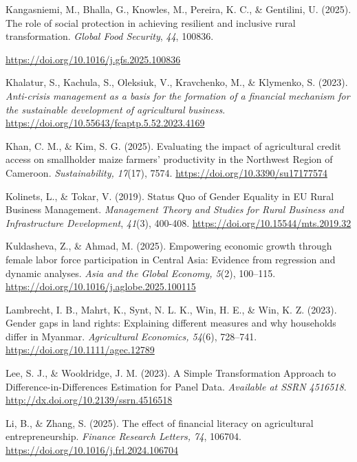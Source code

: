 ﻿\documentclass[sn-mathphys-num]{sn-jnl}
\newcommand{\hl}[1]{#1}
\begin{document}
\hl{Kangasniemi, M., Bhalla, G., Knowles, M., Pereira, K. C., \&
Gentilini, U. (2025). The role of social protection in achieving
resilient and inclusive rural transformation. \emph{Global Food
Security}, \emph{44}, 100836.}

\href{https://doi.org/10.1016/j.gfs.2025.100836}{\hl{https://doi.org/10.1016/j.gfs.2025.100836}}

\hl{Khalatur, S., Kachula, S., Oleksiuk, V., Kravchenko, M., \&
Klymenko, S. (2023). \emph{Anti-crisis management as a basis for the
formation of a financial mechanism for the sustainable development of
agricultural business}.}
\href{https://doi.org/10.55643/fcaptp.5.52.2023.4169}{\hl{https://doi.org/10.55643/fcaptp.5.52.2023.4169}}

\hl{Khan, C. M., \& Kim, S. G. (2025). Evaluating the impact of
agricultural credit access on smallholder maize farmers' productivity in
the Northwest Region of Cameroon. \emph{Sustainability, 17}(17), 7574.}
\href{https://doi.org/10.3390/su17177574}{\hl{https://doi.org/10.3390/su17177574}}

\hl{Kolinets, L., \& Tokar, V. (2019). Status Quo of Gender Equality in
EU Rural Business Management. \emph{Management Theory and Studies for
Rural Business and Infrastructure Development}, \emph{41}(3), 400-408.}
\href{https://doi.org/10.15544/mts.2019.32}{\hl{https://doi.org/10.15544/mts.2019.32}}

\hl{Kuldasheva, Z., \& Ahmad, M. (2025). Empowering economic growth
through female labor force participation in Central Asia: Evidence from
regression and dynamic analyses. \emph{Asia and the Global Economy,
5}(2), 100--115.}
\href{https://doi.org/10.1016/j.aglobe.2025.100115}{\hl{https://doi.org/10.1016/j.aglobe.2025.100115}}

\hl{Lambrecht, I. B., Mahrt, K., Synt, N. L. K., Win, H. E., \& Win, K.
Z. (2023). Gender gaps in land rights: Explaining different measures and
why households differ in Myanmar. \emph{Agricultural Economics, 54}(6),
728--741.}
\href{https://doi.org/10.1111\%2Fagec.12789}{\hl{https://doi.org/10.1111/agec.12789}}

\hl{Lee, S. J., \& Wooldridge, J. M. (2023). A Simple Transformation
Approach to Difference-in-Differences Estimation for Panel Data.
\emph{Available at SSRN 4516518}.}
\href{http://dx.doi.org/10.2139/ssrn.4516518.}{\hl{http://dx.doi.org/10.2139/ssrn.4516518}}

\hl{Li, B., \& Zhang, S. (2025). The effect of financial literacy on
agricultural entrepreneurship. \emph{Finance Research Letters, 74},
106704.}
\href{https://doi.org/10.1016/j.frl.2024.106704}{\hl{https://doi.org/10.1016/j.frl.2024.106704}}
\end{document}
